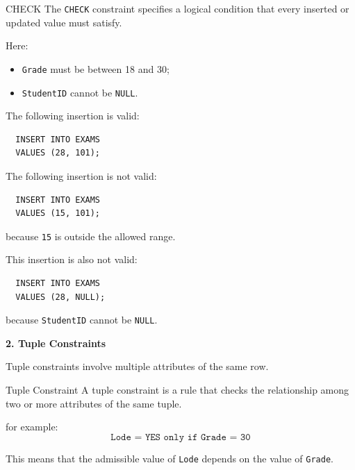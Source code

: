  \begin{defbox}{CHECK}
  The \texttt{CHECK} constraint specifies a logical condition that every inserted or updated value must satisfy.
 \end{defbox}

 Here:
 \begin{itemize}
  \item \texttt{Grade} must be between 18 and 30;
  \item \texttt{StudentID} cannot be \texttt{NULL}.
 \end{itemize}


  The following insertion is valid:
  \begin{verbatim}
  INSERT INTO EXAMS
  VALUES (28, 101);
  \end{verbatim}

  The following insertion is not valid:
  \begin{verbatim}
  INSERT INTO EXAMS
  VALUES (15, 101);
  \end{verbatim}

  \vspace{-0.4cm}
  because \texttt{15} is outside the allowed range.

  \vs
  This insertion is also not valid:
  \begin{verbatim}
  INSERT INTO EXAMS
  VALUES (28, NULL);
  \end{verbatim}

    \vspace{-0.4cm}
  because \texttt{StudentID} cannot be \texttt{NULL}.

\vspace{0.3cm}
 \textbf{2. Tuple Constraints}

 Tuple constraints involve multiple attributes of the same row.

 \begin{defbox}{Tuple Constraint}
  A tuple constraint is a rule that checks the relationship among two or more attributes of the same tuple.
 \end{defbox}

 for example:
 \[
  \texttt{Lode = YES only if Grade = 30}
 \]

 This means that the admissible value of \texttt{Lode} depends on the value of \texttt{Grade}.

\vs

